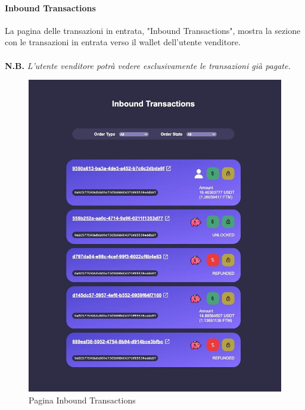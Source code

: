         \paragraph{Inbound Transactions}
        La pagina delle transazioni in entrata, "Inbound Transactions", mostra la sezione con le transazioni in entrata verso il wallet dell'utente venditore.\\\\
        \textbf{N.B.} \textit{L'utente venditore potrà vedere esclusivamente le transazioni già pagate.}\\
        \begin{figure}[H]
            \centering
            \includegraphics[scale=0.3]{immagini/Transaction/inboundTransactions.png}
            \caption{Pagina Inbound Transactions}
        \end{figure}
